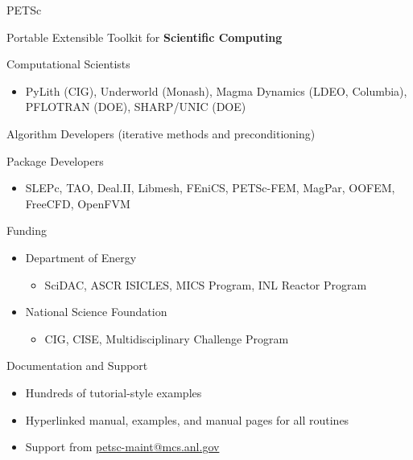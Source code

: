\begin{frame}{PETSc}
\vspace*{-0.2cm}
\begin{center}
 Portable Extensible Toolkit for {\bf Scientific Computing}
\end{center}
\vspace*{-0.2cm}

  \begin{block}{Computational Scientists}
    \begin{itemize}\vspace*{-0.2cm}
    \item PyLith (CIG), Underworld (Monash), Magma Dynamics (LDEO, Columbia), PFLOTRAN (DOE), SHARP/UNIC (DOE)
    \end{itemize}
  \end{block}\vspace*{-0.2cm}
  
  \begin{block}{ Algorithm Developers (iterative methods and preconditioning)} \end{block}\vspace*{-0.4cm}
  
  \begin{block}{ Package Developers}
    \begin{itemize} \vspace*{-0.2cm}
    \item SLEPc, TAO, Deal.II, Libmesh, FEniCS, PETSc-FEM, MagPar, OOFEM, FreeCFD, OpenFVM
    \end{itemize}
  \end{block}\vspace*{-0.2cm}
  
  \begin{block}{Funding}
    \begin{itemize} \vspace*{-0.2cm}    
      \item Department of Energy
      \begin{itemize}\item SciDAC, ASCR ISICLES, MICS Program, INL Reactor Program
      \end{itemize}
    \item National Science Foundation
      \begin{itemize}\item CIG, CISE, Multidisciplinary Challenge Program
      \end{itemize}
    \end{itemize}
  \end{block}\vspace*{-0.2cm}
  
  \begin{block}{Documentation and Support}
   \begin{itemize}\vspace*{-0.2cm}
    \item Hundreds of tutorial-style examples
    \item Hyperlinked manual, examples, and manual pages for all routines
    \item Support from \url{petsc-maint@mcs.anl.gov}
   \end{itemize}
  \end{block}
  
\end{frame}
